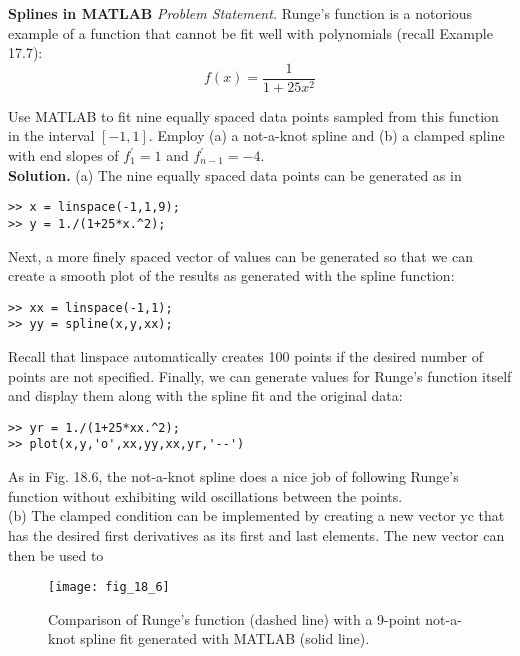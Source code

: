 \documentclass[../main.tex]{subfiles}
\begin{document}
\begin{exmp} \textbf{Splines in MATLAB}
    \noindent\textit{Problem Statement.} Runge’s function is a notorious example of a function that cannot
    be fit well with polynomials (recall Example 17.7):
    \begin{equation}
        f(x)=\frac{1}{1+25 x^{2}}\nonumber
    \end{equation}

Use MATLAB to fit nine equally spaced data points sampled from this function in the interval $[-1,1]$. Employ (a) a not-a-knot spline and (b) a clamped spline with end slopes of $f_{1}^{\prime}=1$ and $f_{n-1}^{\prime}=-4$.\\
\noindent \textbf{Solution.} (a) The nine equally spaced data points can be generated as in

\begin{lstlisting}[numbers=none]
>> x = linspace(-1,1,9);
>> y = 1./(1+25*x.^2);
\end{lstlisting}

Next, a more finely spaced vector of values can be generated so that we can create a smooth
plot of the results as generated with the spline function:

\begin{lstlisting}[numbers=none]
>> xx = linspace(-1,1);
>> yy = spline(x,y,xx);
\end{lstlisting}

Recall that linspace automatically creates 100 points if the desired number of points are
not specified. Finally, we can generate values for Runge's function itself and display them
along with the spline fit and the original data:

\begin{lstlisting}[numbers=none]
>> yr = 1./(1+25*xx.^2);
>> plot(x,y,'o',xx,yy,xx,yr,'--')
\end{lstlisting}
As in Fig. 18.6, the not-a-knot spline does a nice job of following Runge's function without exhibiting wild oscillations between the points.
\\(b) The clamped condition can be implemented by creating a new vector yc that has the
desired first derivatives as its first and last elements. The new vector can then be used to

\begin{figure}[H]
    \centering
    \texttt{[image: fig\_18\_6]}
   \caption{\textsf{Comparison of Runge's function (dashed line) with a 9-point not-a-knot spline fit generated with
   MATLAB (solid line).}}\label{fig:fig_18_6}
\end{figure}


\end{exmp}
\end{document}
